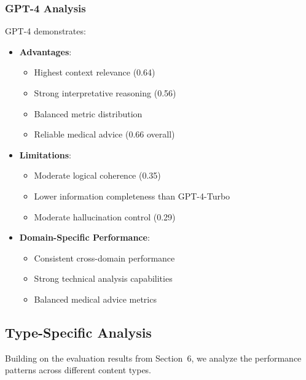\subsubsection{GPT-4 Analysis}
GPT-4 demonstrates:
\begin{itemize}
    \item \textbf{Advantages}:
    \begin{itemize}
        \item Highest context relevance (0.64)
        \item Strong interpretative reasoning (0.56)
        \item Balanced metric distribution
        \item Reliable medical advice (0.66 overall)
    \end{itemize}
    \vspace{0.5em}
    \item \textbf{Limitations}:
    \begin{itemize}
        \item Moderate logical coherence (0.35)
        \item Lower information completeness than GPT-4-Turbo
        \item Moderate hallucination control (0.29)
    \end{itemize}
    \vspace{0.5em}
    \item \textbf{Domain-Specific Performance}:
    \begin{itemize}
        \item Consistent cross-domain performance
        \item Strong technical analysis capabilities
        \item Balanced medical advice metrics
    \end{itemize}
\end{itemize}

\subsection{Type-Specific Analysis}
Building on the evaluation results from Section~6, we analyze the performance patterns across different content types.

\vspace{0.5em}
